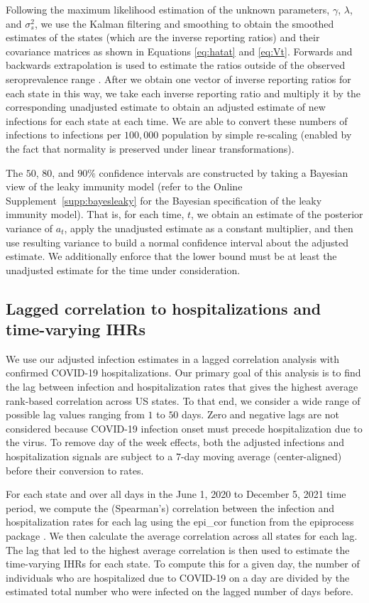 \documentclass{article}
\begin{document}
Following the maximum likelihood estimation of the unknown parameters, $\gamma$,
$\lambda$, and $\sigma^2_s$, we use the Kalman filtering and smoothing to obtain the
smoothed estimates of the states (which are the inverse reporting ratios) and
their covariance matrices as shown in Equations \ref{eq:hatat} and \ref{eq:Vt}.
Forwards and backwards extrapolation is used to estimate the ratios outside of the 
observed seroprevalence range \citet{durbin2012time}. After we obtain one vector of 
inverse reporting ratios for each state in this
way, we take each inverse reporting ratio and multiply it by the corresponding
unadjusted estimate to obtain an adjusted estimate of new infections for each
state at each time. We are able to convert these numbers of infections to
infections per $100,000$ population by simple re-scaling (enabled by the fact
that normality is preserved under linear transformations).

The $50$, $80$, and $90\%$ confidence intervals are constructed by taking a
Bayesian view of the leaky immunity model (refer to the Online
Supplement~\ref{supp:bayesleaky} for the Bayesian specification of the leaky
immunity model). That is, for each time, $t$, we obtain an estimate of the
posterior variance of $a_t$, apply the unadjusted estimate as a constant
multiplier, and then use resulting variance to build a normal confidence
interval about the adjusted estimate. We additionally enforce that the lower
bound must be at least the unadjusted estimate for the time under consideration.

\subsection{Lagged correlation to hospitalizations and time-varying IHRs} 

We use our adjusted infection estimates in a lagged correlation analysis with
confirmed COVID-19 hospitalizations. Our primary goal of this analysis is to
find the lag between infection and hospitalization rates that gives the highest
average rank-based correlation across US states. To that end, we consider a wide
range of possible lag values ranging from $1$ to $50$ days. Zero and negative
lags are not considered because COVID-19 infection onset must precede
hospitalization due to the virus. To remove day of the week effects, both the
adjusted infections and hospitalization signals are subject to a $7$-day moving
average (center-aligned) before their conversion to rates.

For each state and over all days in the June 1, 2020 to December 5, 2021 time
period, we compute the (Spearman’s) correlation between the infection and
hospitalization rates for each lag using the epi\_cor function from the
epiprocess package \citep{brooks2023epiprocess}. We then calculate the average
correlation across all states for each lag. The lag that led to the highest
average correlation is then used to estimate the time-varying IHRs for each
state. To compute this for a given day, the number of individuals who are
hospitalized due to COVID-19 on a day are divided by the estimated total number
who were infected on the lagged number of days before.
\end{document}
